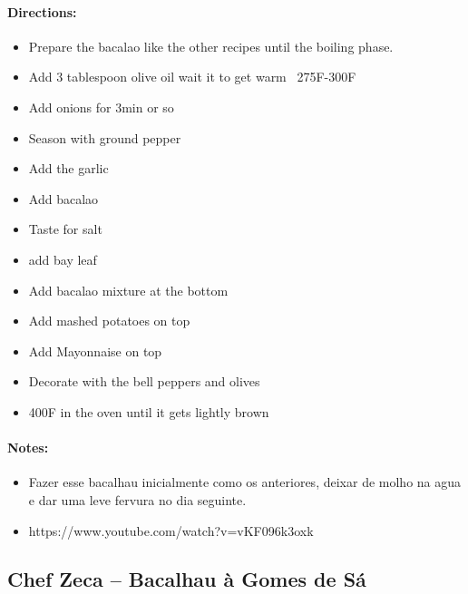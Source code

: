 \documentclass{article}
\begin{document}
\paragraph{Directions:}
\begin{itemize}
    \item Prepare the bacalao like the other recipes until the boiling phase.
    \item Add 3 tablespoon olive oil wait it to get warm ~275F-300F
    \item Add onions for 3min or so
    \item Season with ground pepper
    \item Add the garlic
    \item Add bacalao
    \item Taste for salt
    \item add bay leaf
    \item Add bacalao mixture at the bottom
    \item Add mashed potatoes on top
    \item Add Mayonnaise on top
    \item Decorate with the bell peppers and olives
    \item 400F in the oven until it gets lightly brown
\end{itemize}

\paragraph{Notes:}
\begin{itemize}
    \item Fazer esse bacalhau inicialmente como os anteriores, deixar de molho na agua e dar uma leve fervura no dia seguinte.
    \item https://www.youtube.com/watch?v=vKF096k3oxk
\end{itemize}

\subsection{Chef Zeca – Bacalhau à Gomes de Sá}
\end{document}
